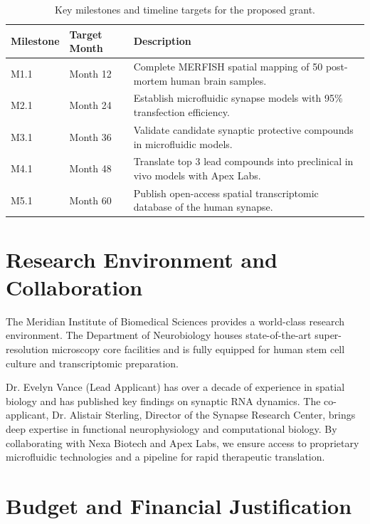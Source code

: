 \documentclass[10pt,a4paper]{article}
\begin{document}
\begin{table}[htbp]
\centering
\sffamily\small
\renewcommand{\arraystretch}{1.2}
\begin{tabularx}{\textwidth}{l l X}
\toprule
\rowcolor{secondarycolor}
\textbf{\color{white}Milestone} & \textbf{\color{white}Target Month} & \textbf{\color{white}Description} \\
\midrule
M1.1 & Month 12 & Complete MERFISH spatial mapping of 50 post-mortem human brain samples. \\
\rowcolor{bgcolor}
M2.1 & Month 24 & Establish microfluidic synapse models with 95\% transfection efficiency. \\
M3.1 & Month 36 & Validate candidate synaptic protective compounds in microfluidic models. \\
\rowcolor{bgcolor}
M4.1 & Month 48 & Translate top 3 lead compounds into preclinical in vivo models with Apex Labs. \\
M5.1 & Month 60 & Publish open-access spatial transcriptomic database of the human synapse. \\
\bottomrule
\end{tabularx}
\caption{Key milestones and timeline targets for the proposed grant.}
\label{tab:milestones}
\end{table}

\section{Research Environment and Collaboration}

The Meridian Institute of Biomedical Sciences provides a world-class research environment. The Department of Neurobiology houses state-of-the-art super-resolution microscopy core facilities and is fully equipped for human stem cell culture and transcriptomic preparation.

Dr. Evelyn Vance (Lead Applicant) has over a decade of experience in spatial biology and has published key findings on synaptic RNA dynamics. The co-applicant, Dr. Alistair Sterling, Director of the Synapse Research Center, brings deep expertise in functional neurophysiology and computational biology. By collaborating with Nexa Biotech and Apex Labs, we ensure access to proprietary microfluidic technologies and a pipeline for rapid therapeutic translation.

\section{Budget and Financial Justification}
\end{document}
